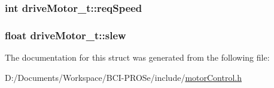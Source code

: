 \subsubsection[{\texorpdfstring{req\+Speed}{reqSpeed}}]{\setlength{\rightskip}{0pt plus 5cm}int drive\+Motor\+\_\+t\+::req\+Speed}\hypertarget{structdrive_motor__t_aea9a93b1f840f9518837e4ce4cdf5665}{}\label{structdrive_motor__t_aea9a93b1f840f9518837e4ce4cdf5665}
\subsubsection[{\texorpdfstring{slew}{slew}}]{\setlength{\rightskip}{0pt plus 5cm}float drive\+Motor\+\_\+t\+::slew}\hypertarget{structdrive_motor__t_a4449f6ef1d4485bd57ac184b4024629e}{}\label{structdrive_motor__t_a4449f6ef1d4485bd57ac184b4024629e}


The documentation for this struct was generated from the following file\+:\begin{DoxyCompactItemize}
\item 
D\+:/\+Documents/\+Workspace/\+B\+C\+I-\/\+P\+R\+O\+Se/include/\hyperlink{motor_control_8h}{motor\+Control.\+h}\end{DoxyCompactItemize}
